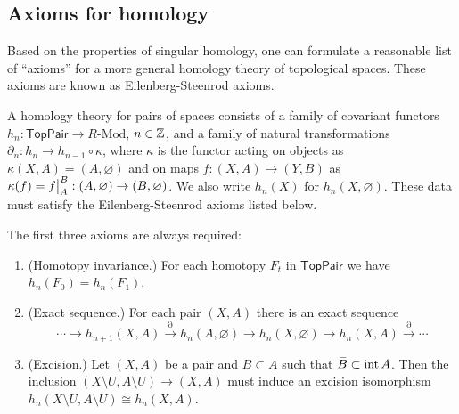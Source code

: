 \subsection{Axioms for homology}

Based on the properties of singular homology, one can formulate a reasonable list of ``axioms'' for a more general homology theory of topological spaces. These axioms are known as Eilenberg-Steenrod axioms.

\begin{defn}
    A homology theory for pairs of spaces consists of a family of covariant functors $h_n:\mathsf{TopPair}\to R\text{-Mod}$, $n\in\mathbb{Z}$, and a family of natural transformations $\partial_n:h_n\to h_{n-1}\circ\kappa$, where $\kappa$ is the functor acting on objects as $\kappa(X,A)=(A,\varnothing)$ and on maps $f:(X,A)\to (Y,B)$ as $\kappa(f)=\restr{f}{A}^B:(A,\varnothing)\to (B,\varnothing)$. We also write $h_n(X)$ for $h_n(X,\varnothing)$. These data must satisfy the Eilenberg-Steenrod axioms listed below.
\end{defn}

The first three axioms are always required:
\begin{enumerate}
    \item (Homotopy invariance.) For each homotopy $F_t$ in $\mathsf{TopPair}$ we have $h_n(F_0)=h_n(F_1)$.
    \item (Exact sequence.) For each pair $(X,A)$ there is an exact sequence
    \[\cdots\to h_{n+1}(X,A)\overset{\partial}\to h_n(A,\varnothing)\to h_n(X,\varnothing)\to h_n(X,A)\overset\partial\to\cdots\]
    \item (Excision.) Let $(X,A)$ be a pair and $B\subset A$ such that $\wb{B}\subset \Int A$. Then the inclusion $(X\setminus U,A\setminus U)\to (X,A)$ must induce an excision isomorphism $h_n(X\setminus U,A\setminus U)\cong h_n(X,A)$.
\end{enumerate}

